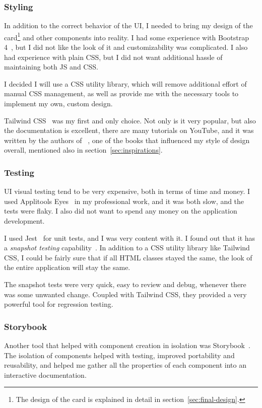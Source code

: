 \subsubsection{Styling}\label{sec:ui-styling}

In addition to the correct behavior of the UI,
I needed to bring my design of the card\footnote{
  The design of the card
  is explained in detail
  in section~\ref{sec:final-design}.
} and other components
into reality.
I had some experience with Bootstrap 4~\cite{otto_bootstrap_2018},
but I did not like the look of it
and customizability was complicated.
I also had experience with plain CSS,
but I did not want additional hassle
of maintaining both JS and CSS.

I decided I will use a CSS utility library,
which will remove additional effort
of manual CSS management,
as well as provide me with the necessary tools
to implement my own, custom design.

Tailwind CSS~\cite{wathan_tailwind_2022}
was my first and only choice.
Not only is it very popular,
but also the documentation is excellent,
there are many tutorials on YouTube,
and it was written by the authors
of ~\cite{wathan_refactoring_2018},
one of the books that influenced
my style of design overall,
mentioned also in section~\ref{sec:inspirations}.

\subsubsection{Testing}\label{sec:ui-testing}

UI visual testing tend to be very expensive,
both in terms of time and money.
I used Applitools Eyes~\cite{applitools_applitools_2022}
in my professional work,
and it was both slow,
and the tests were flaky.
I also did not want to spend any money
on the application development.

I used Jest~\cite{bekkhus_jest_2022} for unit tests,
and I was very content with it.
I found out that it has
a \textit{snapshot testing} capability~\cite{bekkhus_snapshot_2022}.
In addition to a CSS utility library
like Tailwind CSS,
I could be fairly sure
that if all HTML classes stayed the same,
the look of the entire application
will stay the same.

The snapshot tests were very quick,
easy to review and debug,
whenever there was some unwanted change.
Coupled with Tailwind CSS,
they provided a very powerful tool
for regression testing.

\subsubsection{Storybook}\label{sec:storybook}

Another tool that helped with
component creation in isolation
was Storybook~\cite{shilman_storybook_2022}.
The isolation of components
helped with testing,
improved portability and reusability,
and helped me gather all the properties
of each component into an interactive
documentation.
